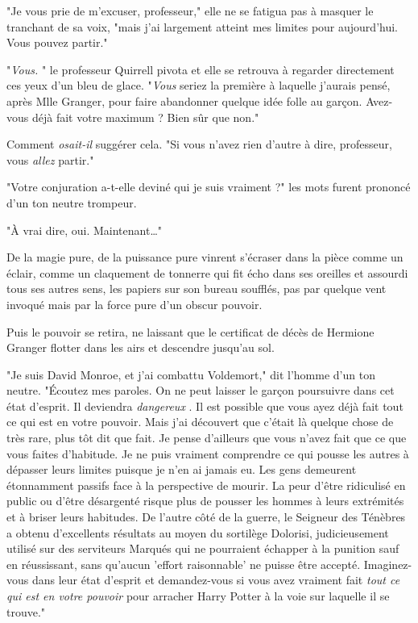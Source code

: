 "Je vous prie de m'excuser, professeur," elle ne se fatigua pas à masquer le tranchant de sa voix, "mais j'ai largement atteint mes limites pour aujourd'hui. Vous pouvez partir."

"\emph{Vous.} " le professeur Quirrell pivota et elle se retrouva à regarder directement ces yeux d'un bleu de glace. "\emph{Vous}  seriez la première à laquelle j'aurais pensé, après Mlle Granger, pour faire abandonner quelque idée folle au garçon. Avez-vous déjà fait votre maximum ? Bien sûr que non."

Comment \emph{osait-il}  suggérer cela. "Si vous n'avez rien d'autre à dire, professeur, vous \emph{allez}  partir."

"Votre conjuration a-t-elle deviné qui je suis vraiment ?" les mots furent prononcé d'un ton neutre trompeur.

"À vrai dire, oui. Maintenant…"

De la magie pure, de la puissance pure vinrent s'écraser dans la pièce comme un éclair, comme un claquement de tonnerre qui fit écho dans ses oreilles et assourdi tous ses autres sens, les papiers sur son bureau soufflés, pas par quelque vent invoqué mais par la force pure d'un obscur pouvoir.

Puis le pouvoir se retira, ne laissant que le certificat de décès de Hermione Granger flotter dans les airs et descendre jusqu'au sol.

"Je suis David Monroe, et j'ai combattu Voldemort," dit l'homme d'un ton neutre. "Écoutez mes paroles. On ne peut laisser le garçon poursuivre dans cet état d'esprit. Il deviendra \emph{dangereux} . Il est possible que vous ayez déjà fait tout ce qui est en votre pouvoir. Mais j'ai découvert que c'était là quelque chose de très rare, plus tôt dit que fait. Je pense d'ailleurs que vous n'avez fait que ce que vous faites d'habitude. Je ne puis vraiment comprendre ce qui pousse les autres à dépasser leurs limites puisque je n'en ai jamais eu. Les gens demeurent étonnamment passifs face à la perspective de mourir. La peur d'être ridiculisé en public ou d'être désargenté risque plus de pousser les hommes à leurs extrémités et à briser leurs habitudes. De l'autre côté de la guerre, le Seigneur des Ténèbres a obtenu d'excellents résultats au moyen du sortilège Dolorisi, judicieusement utilisé sur des serviteurs Marqués qui ne pourraient échapper à la punition sauf en réussissant, sans qu'aucun 'effort raisonnable' ne puisse être accepté. Imaginez-vous dans leur état d'esprit et demandez-vous si vous avez vraiment fait \emph{tout ce qui est en votre pouvoir}  pour arracher Harry Potter à la voie sur laquelle il se trouve."

